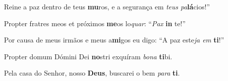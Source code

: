\begin{greenumerate}
  \switchcolumn%

  \item Reine a paz dentro de teus \textbf{mu}ros, {\GreStar} e a segurança em \textit{teus pa}\textbf{lá}cios!'' 

  \switchcolumn*

  \item Propter fratres meos et próximos \textbf{me}os {\GreStar} lo\textit{quar}: ``\textit{Pax} \textbf{in} te!'' 

  \switchcolumn%

  \item Por causa de meus irmãos e meus a\textbf{mi}gos {\GreStar} eu digo: ``A paz este\textit{ja em} \textbf{ti}!'' 

  \switchcolumn*

  \item Propter domum Dómini Dei \textbf{no}stri {\GreStar} exquíram \textit{bona} \textbf{ti}bi. 

  \switchcolumn%

  \item Pela casa do Senhor, nosso \textbf{Deus}, {\GreStar} buscarei o bem \textit{para} \textbf{ti}. 
\end{greenumerate}
